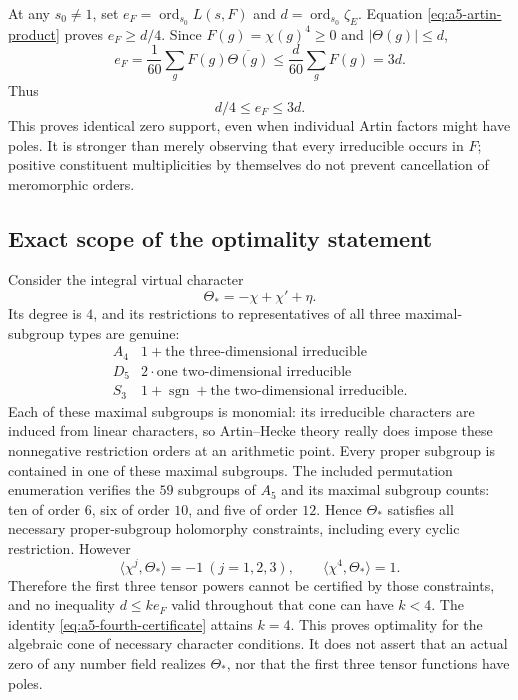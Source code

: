 At any $s_0\ne1$, set $e_F=\operatorname{ord}_{s_0}L(s,F)$ and
$d=\operatorname{ord}_{s_0}\zeta_E$. Equation
\eqref{eq:a5-artin-product} proves $e_F\ge d/4$.
Since $F(g)=\chi(g)^4\ge0$ and $|\Theta(g)|\le d$,
\[
 e_F=\frac1{60}\sum_gF(g)\overline{\Theta(g)}
 \le\frac d{60}\sum_gF(g)=3d.
\]
Thus
\begin{equation}\label{eq:a5-multiplicities}
 \boxed{\quad d/4\le e_F\le3d.\quad}
\end{equation}
This proves identical zero support, even when individual Artin factors
might have poles. It is stronger than merely observing that every
irreducible occurs in $F$; positive constituent multiplicities by
 themselves do not prevent cancellation of meromorphic orders.

\subsection{Exact scope of the optimality statement}
Consider the integral virtual character
\[
 \Theta_*=-\chi+\chi'+\eta.
\]
Its degree is $4$, and its restrictions to representatives of all three
maximal-subgroup types are genuine:
\[
\begin{array}{c|l}
 A_4&1+\text{the three-dimensional irreducible}\\
 D_5&2\cdot\text{one two-dimensional irreducible}\\
 S_3&1+\operatorname{sgn}+\text{the two-dimensional irreducible}.
\end{array}
\]
Each of these maximal subgroups is monomial: its irreducible characters
are induced from linear characters, so Artin--Hecke theory really does
impose these nonnegative restriction orders at an arithmetic point.
Every proper subgroup is contained in one of these maximal subgroups.
The included permutation enumeration verifies the $59$ subgroups of $A_5$
and its maximal subgroup counts: ten of order $6$, six of order $10$, and
five of order $12$. Hence $\Theta_*$ satisfies all necessary
proper-subgroup holomorphy constraints, including every cyclic restriction.
However
\[
 \langle\chi^j,\Theta_*\rangle=-1\ (j=1,2,3),\qquad
 \langle\chi^4,\Theta_*\rangle=1.
\]
Therefore the first three tensor powers cannot be certified by those
constraints, and no inequality $d\le k e_F$ valid throughout that cone can
have $k<4$. The identity \eqref{eq:a5-fourth-certificate} attains $k=4$.
This proves optimality for the algebraic cone of necessary character
conditions. It does not assert that an actual zero of any number field
realizes $\Theta_*$, nor that the first three tensor functions have poles.


